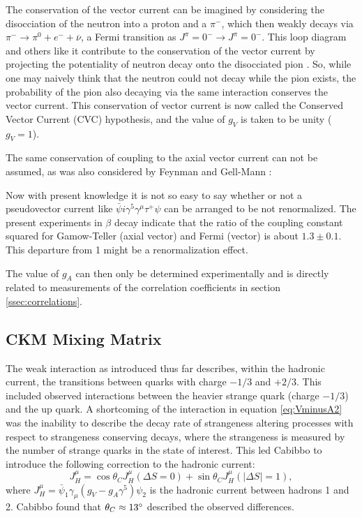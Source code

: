 The conservation of the vector current can be imagined by considering the disocciation of the neutron
into a proton and a $\pi^{-}$, which then weakly decays via $\pi^- \rightarrow \pi^0+e^- + \overline{\nu}$,
a Fermi transition as $J^\pi=0^- \rightarrow J^\pi=0^-$. This loop diagram and others like it contribute to the
conservation of the vector current by projecting
the potentiality of neutron decay onto the disocciated pion \cite{grotz1990}. So, while one may naively
think that the neutron could not decay while the pion exists, the probability of the pion also decaying
via the same interaction conserves the vector current.
This conservation of vector current is now called the
Conserved Vector Current (CVC) hypothesis, and the value of $g_V$ is taken to be unity ($g_V = 1$).

The same conservation of coupling to the axial vector current can not be assumed, as was also 
considered by Feynman and Gell-Mann \cite{feynman1958}:
%
\begin{displayquote}
Now with present knowledge it is not so easy to say
whether or not a pseudovector current like
$\bar{\psi}i\gamma^5\gamma^\mu\tau^+\psi$
can be arranged to be not renormalized. The present
experiments in $\beta$ decay indicate that the ratio of the
coupling constant squared for Gamow-Teller (axial vector) and Fermi
(vector)
is about $1.3\pm0.1$. This departure from 1 might be a
renormalization effect.
\end{displayquote}
%
The value of $g_A$ can then only be determined experimentally and is directly related to measurements
of the correlation coefficients in section \ref{ssec:correlations}.


\subsection{CKM Mixing Matrix}
The weak interaction as introduced thus far describes, within the hadronic current, the transitions
between quarks with charge $-1/3$ and $+2/3$. This included observed interactions between the heavier
strange quark (charge $-1/3$) and the up quark. 
A shortcoming of the interaction in equation \ref{eq:VminusA2} was the inability to describe
the decay rate of strangeness altering processes with respect to strangeness conserving
decays, where the strangeness is measured by the number of strange quarks in the state of interest.
This led Cabibbo \cite{cabibbo1963} to introduce the following correction to the hadronic current:
%
\begin{equation}
  J^\mu_H = \cos\theta_C J^\mu_H(\Delta S=0) + \sin\theta_C J^\mu_H(|\Delta S|=1),
  \label{eq:cabibbo}
\end{equation}
%
where $J^\mu_H = \bar{\psi}_1 \gamma_\mu(g_V-g_A\gamma^5)\psi_2$ is the hadronic current between
hadrons 1 and 2. Cabibbo found that $\theta_C \approx 13\degree$ described the observed differences.

